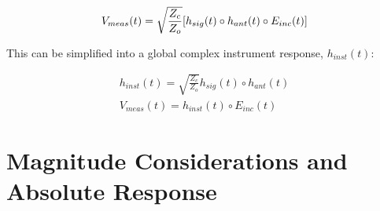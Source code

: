 \begin{equation}
V_{meas}(t) = \sqrt{\frac{Z_{c}}{Z_{o}}}[h_{sig}(t) \circ h_{ant}(t) \circ E_{inc}(t)] \\
\label{eqn:fullConvolution}
\end{equation}

This can be simplified into a global complex instrument response, $h_{inst}(t)$:

\begin{equation}
\begin{split}
h_{inst}(t) = \sqrt{\frac{Z_{c}}{Z_{o}}}h_{sig}(t) \circ h_{ant}(t) \\ 
V_{meas}(t) = h_{inst}(t) \circ E_{inc}(t)
\end{split}
\label{eqn:instTF}
\end{equation}


\section{Magnitude Considerations and Absolute Response}
	
